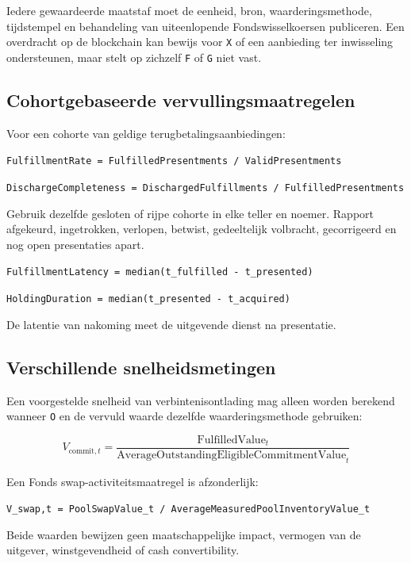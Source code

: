 \documentclass[11pt]{article}
\begin{document}
Iedere gewaardeerde maatstaf moet de eenheid, bron, waarderingsmethode, tijdstempel en behandeling van uiteenlopende Fondswisselkoersen publiceren. Een overdracht op de blockchain kan bewijs voor \texttt{X} of een aanbieding ter inwisseling ondersteunen, maar stelt op zichzelf \texttt{F} of \texttt{G} niet vast.

\subsection*{Cohortgebaseerde vervullingsmaatregelen}

Voor een cohorte van geldige terugbetalingsaanbiedingen:

\texttt{FulfillmentRate = FulfilledPresentments / ValidPresentments}

\texttt{DischargeCompleteness = DischargedFulfillments / FulfilledPresentments}

Gebruik dezelfde gesloten of rijpe cohorte in elke teller en noemer. Rapport afgekeurd, ingetrokken, verlopen, betwist, gedeeltelijk volbracht, gecorrigeerd en nog open presentaties apart.

\texttt{FulfillmentLatency = median(t\_fulfilled - t\_presented)}

\texttt{HoldingDuration = median(t\_presented - t\_acquired)}

De latentie van nakoming meet de uitgevende dienst na presentatie.

\subsection*{Verschillende snelheidsmetingen}

Een voorgestelde snelheid van verbintenisontlading mag alleen worden berekend wanneer \texttt{O} en de vervuld waarde dezelfde waarderingsmethode gebruiken:

\[
V_{\mathrm{commit},t} = \frac{\mathrm{FulfilledValue}_t}{\mathrm{AverageOutstandingEligibleCommitmentValue}_t}
\]

Een Fonds swap-activiteitsmaatregel is afzonderlijk:

\texttt{V\_swap,t = PoolSwapValue\_t / AverageMeasuredPoolInventoryValue\_t}

Beide waarden bewijzen geen maatschappelijke impact, vermogen van de uitgever, winstgevendheid of cash convertibility.
\end{document}
